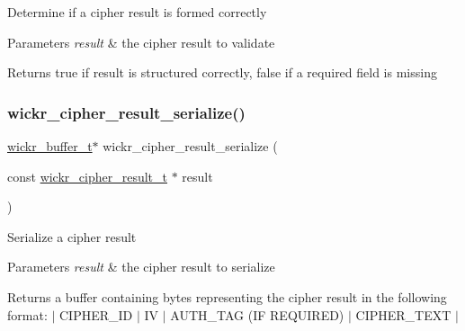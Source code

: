 Determine if a cipher result is formed correctly


\begin{DoxyParams}{Parameters}
{\em result} & the cipher result to validate \\
\hline
\end{DoxyParams}
\begin{DoxyReturn}{Returns}
true if result is structured correctly, false if a required field is missing 
\end{DoxyReturn}
\mbox{\label{group__wickr__cipher_gacda386115dc52f83a0518f8ac0dad6a2}} 
\subsubsection{\texorpdfstring{wickr\+\_\+cipher\+\_\+result\+\_\+serialize()}{wickr\_cipher\_result\_serialize()}}
{\footnotesize\ttfamily \mbox{\hyperlink{structwickr__buffer}{wickr\+\_\+buffer\+\_\+t}}$\ast$ wickr\+\_\+cipher\+\_\+result\+\_\+serialize (\begin{DoxyParamCaption}\item[{const \mbox{\hyperlink{structwickr__cipher__result}{wickr\+\_\+cipher\+\_\+result\+\_\+t}} $\ast$}]{result }\end{DoxyParamCaption})}

Serialize a cipher result


\begin{DoxyParams}{Parameters}
{\em result} & the cipher result to serialize \\
\hline
\end{DoxyParams}
\begin{DoxyReturn}{Returns}
a buffer containing bytes representing the cipher result in the following format\+: $\vert$ C\+I\+P\+H\+E\+R\+\_\+\+ID $\vert$ IV $\vert$ A\+U\+T\+H\+\_\+\+T\+AG (IF R\+E\+Q\+U\+I\+R\+ED) $\vert$ C\+I\+P\+H\+E\+R\+\_\+\+T\+E\+XT $\vert$ 
\end{DoxyReturn}
